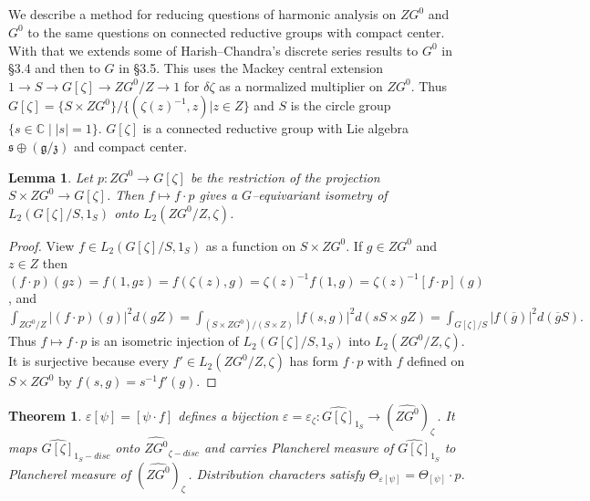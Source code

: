 \documentclass{conm-p-l}
\newtheorem{theorem}[equation]{Theorem}
\newtheorem{lemma}[equation]{Lemma}
\renewcommand{\gg}{\mathfrak{g}}
\def\gg{\mathfrak{g}}
\def\gs{\mathfrak{s}}
\def\gz{\mathfrak{z}}
\def\C{\mathbb{C}}
\begin{document}
\subsection{}\label{ssec3c}  
\setcounter{equation}{0}
We describe a method for reducing questions of 
harmonic analysis on $ZG^0$ and $G^0$ to the same questions on connected
reductive groups with compact center.  With that we extends some of
Harish--Chandra's discrete series results \cite{HC1966} to $G^0$ in
\S 3.4 and then to $G$ in \S 3.5.  This uses the Mackey central extension
$1 \to S \to G[\zeta] \to ZG^0/Z \to 1$ for $\delta\zeta$ as a normalized
multiplier on $ZG^0$.  Thus
$G[\zeta] = \{S\times ZG^0\}/\{(\zeta(z)^{-1},z)| z \in Z\}$ and $S$ is
the circle group $\{s \in \C \mid |s| = 1\}$.
$G[\zeta]$ is a connected reductive group with Lie algebra 
$\gs \oplus (\gg/\gz)$ and compact center.

\begin{lemma}\label{3.3.2}
Let $p:ZG^0 \to G[\zeta]$ be the restriction of the projection
$S\times ZG^0 \to G[\zeta]$.  Then $f \mapsto f\cdot p$ gives a
$G$--equivariant isometry of $L_2(G[\zeta]/S,1_S)$ onto $L_2(ZG^0/Z,\zeta)$.
\end{lemma}

\begin{proof}  View $f \in L_2(G[\zeta]/S,1_S)$ as a function on $S\times ZG^0$.
If $g \in ZG^0$ and $z \in Z$ then
$(f\cdot p)(gz) = f(1,gz) = f(\zeta(z),g) = \zeta(z)^{-1}f(1,g)
= \zeta(z)^{-1}[f\cdot p](g)$, and
$\int_{ZG^0/Z} |(f\cdot p)(g)|^2d(gZ) 
= \int_{(S\times ZG^0)/(S\times Z)}
|f(s,g)|^2 d(sS \times gZ) 
= \int_{G[\zeta]/S} |f(\overline{g})|^2d(\overline{g}S).$
Thus $f \mapsto f\cdot p$ is an isometric injection of $L_2(G[\zeta]/S,1_S)$
into $L_2(ZG^0/Z,\zeta)$.  It is surjective because every 
$f' \in L_2(ZG^0/Z,\zeta)$ has form $f\cdot p$ with $f$ defined on 
$S \times ZG^0$ by $f(s,g) = s^{-1}f'(g)$.
\end{proof}

\begin{theorem}\label{3.3.3}
$\varepsilon[\psi] = [\psi\cdot f]$ defines a bijection
$\varepsilon = \varepsilon_\zeta :
\widehat{G[\zeta]}_{1_S} \to (\widehat{ZG^0})_\zeta$\,.
It maps $\widehat{G[\zeta]}_{1_S-disc}$
onto $\widehat{ZG^0}_{\zeta-disc}$ and carries Plancherel measure of
$\widehat{G[\zeta]}_{1_S}$ to Plancherel measure of $(\widehat{ZG^0})_\zeta$\,.
Distribution characters satisfy $\Theta_{\varepsilon[\psi]} = 
\Theta_{[\psi]}\cdot p$.
\end{theorem}
\end{document}
